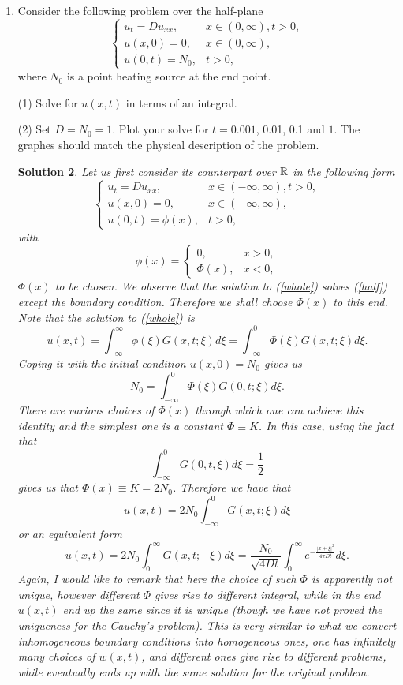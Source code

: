 \documentclass[6pt]{article}
\newtheorem{solution}{Solution}
\numberwithin{equation}{section}
\def\mathbb{\Bbb}
\begin{document}
\begin{enumerate}
\begin{solution}
(b).  See figure \ref{figure1}.
\end{solution}

\item Consider the following problem over the half-plane
\begin{equation}
\left\{
\begin{array}{ll}
u_t=D u_{xx},& x\in (0,\infty), t>0,\\
u(x,0)=0,&x \in (0,\infty),\\
u(0,t)=N_0,&t>0,
\end{array}
\right.
\end{equation}
where $N_0$ is a point heating source at the end point.

(1) Solve for $u(x,t)$ in terms of an integral.


(2) Set $D=N_0=1$.  Plot your solve for $t=0.001$, 0.01, 0.1 and $1$.  The graphes should match the physical description of the problem.
\begin{solution}
Let us first consider its counterpart over $\mathbb R$ in the following form
\begin{equation}\label{whole}
\left\{
\begin{array}{ll}
u_t=D u_{xx},& x\in (-\infty,\infty), t>0,\\
u(x,0)=0,&x \in (-\infty,\infty),\\
u(0,t)=\phi(x),& t>0,
\end{array}
\right.
\end{equation}
with
\[\phi(x)=\left\{
\begin{array}{ll}
0,&x >0,\\
\Phi(x),& x<0,
\end{array}
\right.
\]
$\Phi(x)$ to be chosen.  We observe that the solution to (\ref{whole}) solves (\ref{half}) except the boundary condition.  Therefore we shall choose $\Phi(x)$ to this end.  Note that the solution to (\ref{whole}) is
\[u(x,t)=\int_{-\infty}^\infty \phi(\xi)G(x,t;\xi)d\xi=\int_{-\infty}^0 \Phi(\xi)G(x,t;\xi)d\xi.\]
Coping it with the initial condition $u(x,0)=N_0$ gives us
\[N_0= \int_{-\infty}^0 \Phi(\xi)G(0,t;\xi)d\xi.\]
There are various choices of $\Phi(x)$ through which one can achieve this identity and the simplest one is a constant $\Phi\equiv K$.  In this case, using the fact that
\[\int_{-\infty}^0 G(0,t,\xi)d\xi=\frac{1}{2}\]
gives us that $\Phi(x)\equiv K=2N_0$.  Therefore we have that
\[u(x,t)=2N_0\int_{-\infty}^0G(x,t;\xi)d\xi\]
 or an equivalent form
 \[u(x,t)=2N_0\int_0^\infty G(x,t;-\xi)d\xi=\frac{N_0}{\sqrt{4Dt}}\int_0^\infty e^{-\frac{|x+\xi|^2}{4\pi Dt}}d\xi.\]
Again, I would like to remark that here the choice of such $\Phi$ is apparently not unique, however different $\Phi$ gives rise to different integral, while in the end $u(x,t)$ end up the same since it is unique (though we have not proved the uniqueness for the Cauchy's problem).  This is very similar to what we convert inhomogeneous boundary conditions into homogeneous ones, one has infinitely many choices of $w(x,t)$, and different ones give rise to different problems, while eventually ends up with the same solution for the original problem.


\end{solution}
\end{enumerate}
\end{document}
